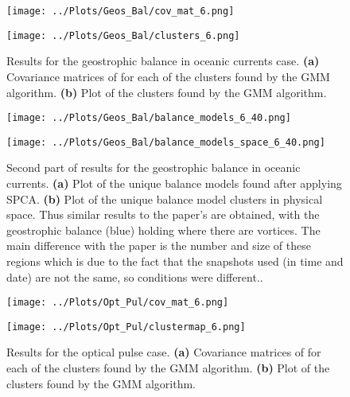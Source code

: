 \documentclass[12pt]{report} %
\begin{document}
\begin{figure}[htbp]
  \centering
  \begin{minipage}{0.7\textwidth}
    \centering
    \texttt{[image: ../Plots/Geos\_Bal/cov\_mat\_6.png]}
    \subcaption{}
  \end{minipage}

  \begin{minipage}{0.7\textwidth}
    \centering
    \texttt{[image: ../Plots/Geos\_Bal/clusters\_6.png]}
    \subcaption{}
  \end{minipage}

  \caption{Results for the geostrophic balance in oceanic currents case. \textbf{(a)} Covariance matrices of for each of the clusters found by the GMM algorithm. \textbf{(b)} Plot of the clusters found by the GMM algorithm.}
  \label{fig:Geos_bal_results_1}
\end{figure}

\begin{figure}[htbp]
  \centering
  \begin{minipage}[b]{0.45\textwidth}
      \centering
      \texttt{[image: ../Plots/Geos\_Bal/balance\_models\_6\_40.png]}
      \subcaption{}
  \end{minipage}

  \begin{minipage}[b]{0.7\textwidth}
    \centering
    \texttt{[image: ../Plots/Geos\_Bal/balance\_models\_space\_6\_40.png]}
    \subcaption{}
  \end{minipage}

  \caption{Second part of results for the geostrophic balance in oceanic currents. \textbf{(a)} Plot of the unique balance models found after applying SPCA. \textbf{(b)} Plot of the unique balance model clusters in physical space. Thus similar results to the paper's are obtained, with the geostrophic balance (blue) holding where there are vortices. The main difference with the paper is the number and size of these regions which is due to the fact that the snapshots used (in time and date) are not the same, so conditions were different..}
  \label{fig:Geos_bal_results_2}
\end{figure}


\begin{figure}[htbp]
  \centering
  \begin{minipage}{0.7\textwidth}
    \centering
    \texttt{[image: ../Plots/Opt\_Pul/cov\_mat\_6.png]}
    \subcaption{}
  \end{minipage}

  \begin{minipage}{0.7\textwidth}
    \centering
    \texttt{[image: ../Plots/Opt\_Pul/clustermap\_6.png]}
    \subcaption{}
  \end{minipage}

  \caption{Results for the optical pulse case. \textbf{(a)} Covariance matrices of for each of the clusters found by the GMM algorithm. \textbf{(b)} Plot of the clusters found by the GMM algorithm.}
  \label{fig:Opt_Pul_results_1}
\end{figure}
\end{document}
